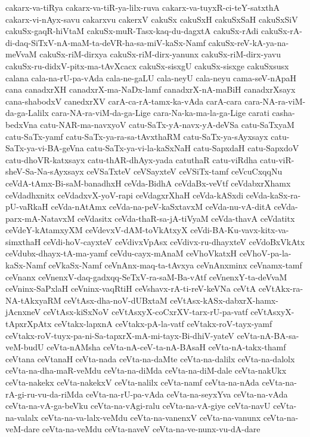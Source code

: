 {cakarx-va-tiRya
cakarx-va-tiR-ya-lilx-ruva
cakarx-va-tuyxR-ci-teY-satxthA
cakarx-vi-nAyx-savu
cakarxvu
cakerxV
cakuSx
cakuSxH
cakuSxSaH
cakuSxSiV
cakuSx-gaqR-hiVtaM
cakuSx-muR-Tasx-kaq-du-dagxtA
cakuSx-rAdi
cakuSx-rA-di-daq-SiTxV-nA-maM-ta-deVR-ha-sa-miV-kaSx-Namf
cakuSx-reV-kA-ya-na-meVvaM
cakuSx-riM-dirxya
cakuSx-riM-dirx-yanunx
cakuSx-riM-dirx-yavu
cakuSx-ru-didxV-pitx-ma-tAvXcacx
cakuSx-sisxgU
cakuSx-sisxge
cakuSxsusx
calana
cala-na-rU-pa-vAda
cala-ne-gaLU
cala-neyU
cala-neyu
cama-seV-nApaH
cana
canadxrXH
canadxrX-ma-NaDx-lamf
canadxrX-nA-maBiH
canadxrXsayx
cana-shabodxV
canedxrXV
carA-ca-rA-tamx-ka-vAda
carA-cara
cara-NA-ra-viM-da-ga-Lalilx
cara-NA-ra-viM-da-ga-Lige
cara-Na-ka-ma-la-ga-Lige
carati
casha-bedxVna
catu-NAR-ma-navxyoV
catu-SaTx-yA-navx-yA-deVSa
catu-SaTxyaM
catu-SaTx-yamf
catu-SaTx-ya-ra-sa-tAvxthaRM
catu-SaTx-ya-sAyxsayx
catu-SaTx-ya-vi-BA-geVna
catu-SaTx-ya-vi-la-kaSxNaH
catu-SapxdaH
catu-SapxdoV
catu-dhoVR-katxsayx
catu-thAR-dhAyx-yada
catuthaR
catu-viRdha
catu-viR-sheV-Sa-Na-sAyxsayx
ceVSaTxteV
ceVSayxteV
ceVSiTx-tamf
ceVcuCxqqNu
ceVdA-tAmx-Bi-saM-banadhxH
ceVda-BidhA
ceVdaBx-veVtf
ceVdabxrXhamx
ceVdadhxnitx
ceVdadxvX-yoV-rapi
ceVdagxrXhaH
ceVda-kASxdi
ceVda-kaSx-ra-pU-vaRkaH
ceVda-nAtAmx
ceVda-na-peV-kaSxtavxM
ceVda-nu-vA-ditA
ceVda-parx-mA-NatavxM
ceVdasitx
ceVda-thaR-sa-jA-tiVyaM
ceVda-thavA
ceVdatitx
ceVdeY-kAtamxyXM
ceVdevxV-dAM-toVkAtxyX
ceVdi-BA-Ku-vavx-kitx-va-simxthaH
ceVdi-hoV-cayxteV
ceVdivxVpAsx
ceVdivx-ru-dhayxteV
ceVdoBxVkAtx
ceVdubx-dhayx-tA-ma-yamf
ceVdu-cayx-mAnaM
ceVhoVkatxH
ceVhoV-pa-la-kaSx-Namf
ceVkaSx-Namf
ceVnAnx-maq-ta-tAvxya
ceVnAnxminx
ceVnamx-tamf
ceVnanx
ceVnenxV-daq-gadxqq-SeTxV-ra-saM-Ba-vAtf
ceVnenxY-ta-deVvaM
ceVninx-SaPxlaH
ceVninx-vaqRtiH
ceVshavx-rA-ti-reV-keVNa
ceVtA
ceVtAkx-ra-NA-tAkxyaRM
ceVtAsx-dha-noV-dUBxtaM
ceVtAsx-kASx-dabxrX-hamx-jAcnxneV
ceVtAsx-kiSxNoV
ceVtAsxyX-coCxrXV-tarx-rU-pa-vatf
ceVtAsxyX-tApxrXpAtx
ceVtakx-lapxnA
ceVtakx-pA-la-vatf
ceVtakx-roV-tayx-yamf
ceVtakx-roV-tuyx-pa-ni-Sa-tapxrX-mA-mi-tayx-Bi-dhiV-yateV
ceVta-nA-BA-sa-veM-budU
ceVta-nAMsha
ceVta-nA-ceV-ta-nA-BAsaH
ceVta-nA-takx-thamf
ceVtana
ceVtanaH
ceVta-nada
ceVta-na-daMte
ceVta-na-dalilx
ceVta-na-dalolx
ceVta-na-dha-maR-veMdu
ceVta-na-diMda
ceVta-na-diM-dale
ceVta-nakUkx
ceVta-nakekx
ceVta-nakekxV
ceVta-nalilx
ceVta-namf
ceVta-na-nAda
ceVta-na-rA-gi-ru-vu-da-riMda
ceVta-na-rU-pa-vAda
ceVta-na-seyxYva
ceVta-na-vAda
ceVta-na-vA-ga-beVku
ceVta-na-vAgi-ralu
ceVta-na-vA-giye
ceVta-navU
ceVta-na-valalx
ceVta-na-va-lalx-veMdu
ceVta-na-vanenxV
ceVta-na-vanunx
ceVta-na-veM-dare
ceVta-na-veMdu
ceVta-naveV
ceVta-na-ve-nunx-vu-dA-dare
}
